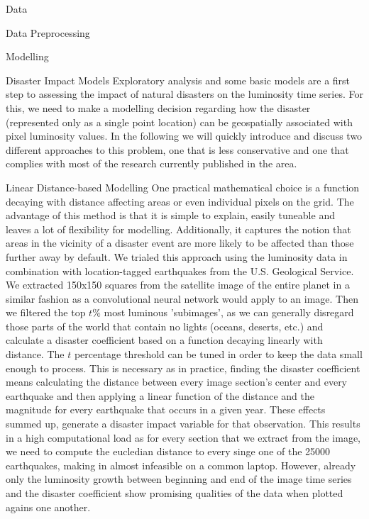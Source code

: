 \documentclass[12.5pt,fleqn,leqno,letterpaper]{article}
\begin{document}
\begin{section}{Data}
\begin{subsection}{Data Preprocessing}
  \end{subsection}

\end{section}


\begin{section}{Modelling}
  \begin{subsection}{Disaster Impact Models}
    Exploratory analysis and some basic models are a first step to assessing the impact of natural disasters on the luminosity time series. For this, we need to make a modelling decision regarding how the disaster (represented only as a single point location) can be geospatially associated with pixel luminosity values. In the following we will quickly introduce and discuss two different approaches to this problem, one that is less conservative and one that complies with most of the research currently published in the area.
    \begin{subsubsection}{Linear Distance-based Modelling}
      One practical mathematical choice is a function decaying with distance affecting areas or even individual pixels on the grid. The advantage of this method is that it is simple to explain, easily tuneable and leaves a lot of flexibility for modelling. Additionally, it captures the notion that areas in the vicinity of a disaster event are more likely to be affected than those further away by default.
      We trialed this approach using the luminosity data in combination with location-tagged earthquakes from the U.S. Geological Service. We extracted 150x150 squares from the satellite image of the entire planet in a similar fashion as a convolutional neural network would apply to an image. Then we filtered the top $t\%$ most luminous 'subimages', as we can generally disregard those parts of the world that contain no lights (oceans, deserts, etc.) and calculate a disaster coefficient based on a function decaying linearly with distance. The $t$ percentage threshold can be tuned in order to keep the data small enough to process. This is necessary as in practice, finding the disaster coefficient means calculating the distance between every image section's center and every earthquake and then applying a linear function of the distance and the magnitude for every earthquake that occurs in a given year. These effects summed up, generate a disaster impact variable for that observation. This results in a high computational load as for every section that we extract from the image, we need to compute the eucledian distance to every singe one of the 25000 earthquakes, making in almost infeasible on a common laptop. However, already only the luminosity growth between beginning and end of the image time series and the disaster coefficient show promising qualities of the data when plotted agains one another.

\end{subsubsection}
\end{subsection}
\end{section}
\end{document}
